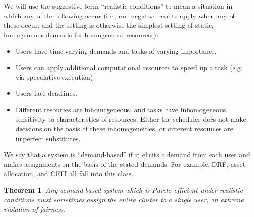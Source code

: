 \documentclass{acm_proc_article-sp}
\newtheorem{theorem}{Theorem}[section]
\begin{document}
We will use the suggestive term ``realistic conditions'' to mean a situation in which any of the following occur (i.e., our negative results apply when any of these occur, and the setting is otherwise the simplest setting of static, homogeneous demands for homogeneous resources):
\vspace{-5mm}
\begin{itemize}
\itemsep0em
\item Users have time-varying demands and tasks of varying importance.
\item Users can apply additional computational resources to speed up a task (e.g. via speculative execution)
\item Users face deadlines.
\item Different resources are inhomogeneous, and tasks have inhomogeneous sensitivity to characteristics of resources. Either the scheduler does not make decisions on the basis of these inhomogeneities, or different resources are imperfect substitutes.
\end{itemize}
\vspace{-5mm}
We say that a system is ``demand-based'' if it elicits a demand from each user and makes assignments on the basis of the stated demands. For example, DRF, asset allocation, and CEEI all fall into this class.
\vspace{-5mm}
\begin{theorem}\label{demand-bad}
Any demand-based system which is Pareto efficient under realistic conditions must sometimes assign the entire cluster to a single user, an extreme violation of fairness.
\end{theorem}
\vspace{-5mm}
\end{document}
